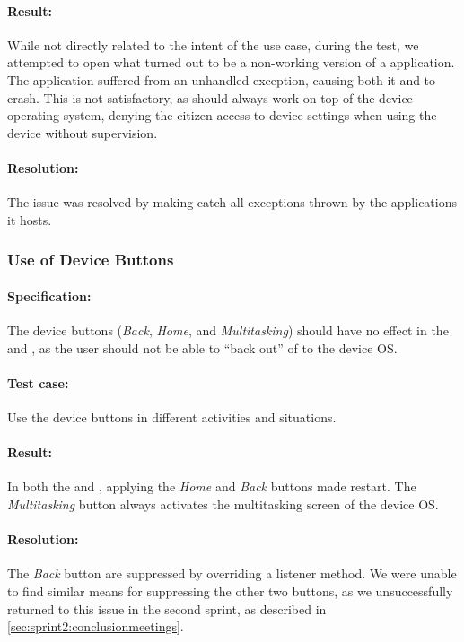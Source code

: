 \paragraph{Result:} While not directly related to the intent of the use case, during the test, we attempted to open what turned out to be a non-working version of a \giraf application. 
The application suffered from an unhandled exception, causing both it and \launcher to crash. 
This is not satisfactory, as \launcher should always work on top of the device operating system, denying the citizen access to device settings when using the device without supervision.
\paragraph{Resolution:} The issue was resolved by making \launcher catch all exceptions thrown by the \giraf applications it hosts.


\subsubsection{Use of Device Buttons}

\paragraph{Specification:} The device buttons (\textit{Back}, \textit{Home}, and \textit{Multitasking}) should have no effect in the \mainactivity and \authenticationactivity, as the user should not be able to ``back out'' of \launcher to the device OS.
\paragraph{Test case:} Use the device buttons in different activities and situations.
\paragraph{Result:} In both the \mainactivity and \authenticationactivity, applying the \textit{Home} and \textit{Back} buttons made \launcher restart. 
The \textit{Multitasking} button always activates the multitasking screen of the device OS.
\paragraph{Resolution:} The \textit{Back} button are suppressed by overriding a listener method.
We were unable to find similar means for suppressing the other two buttons, as we unsuccessfully returned to this issue in the second sprint, as described in \cref{sec:sprint2:conclusionmeetings}.